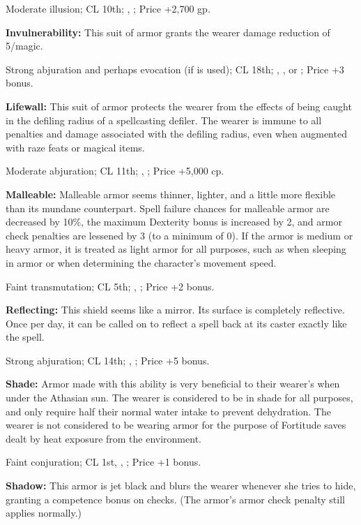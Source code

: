 Moderate illusion; CL 10th; , ; Price +2,700 gp.

\textbf{Invulnerability:} This suit of armor grants the wearer damage reduction of 5/magic.

Strong abjuration and perhaps evocation (if  is used); CL 18th; , ,  or ; Price +3 bonus.

\textbf{Lifewall:} This suit of armor protects the wearer from the effects of being caught in the defiling radius of a spellcasting defiler. The wearer is immune to all penalties and damage associated with the defiling radius, even when augmented with raze feats or magical items.

Moderate abjuration; CL 11th; , ; Price +5,000 cp.

\textbf{Malleable:} Malleable armor seems thinner, lighter, and a little more flexible than its mundane counterpart. Spell failure chances for malleable armor are decreased by 10\%, the maximum Dexterity bonus is increased by 2, and armor check penalties are lessened by 3 (to a minimum of 0). If the armor is medium or heavy armor, it is treated as light armor for all purposes, such as when sleeping in armor or when determining the character's movement speed.

Faint transmutation; CL 5th; , ; Price +2 bonus.

\textbf{Reflecting:} This shield seems like a mirror. Its surface is completely reflective. Once per day, it can be called on to reflect a spell back at its caster exactly like the  spell.

Strong abjuration; CL 14th; , ; Price +5 bonus. 

\textbf{Shade:} Armor made with this ability is very beneficial to their wearer's when under the Athasian sun. The wearer is considered to be in shade for all purposes, and only require half their normal water intake to prevent dehydration. The wearer is not considered to be wearing armor for the purpose of Fortitude saves dealt by heat exposure from the environment.

Faint conjuration; CL 1st, , ; Price +1 bonus.

\textbf{Shadow:} This armor is jet black and blurs the wearer whenever she tries to hide, granting a competence bonus on  checks. (The armor's armor check penalty still applies normally.)

